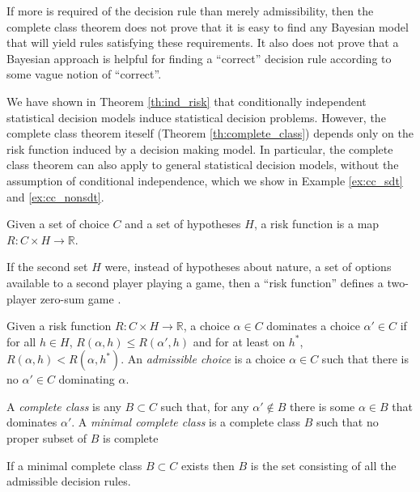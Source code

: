 If more is required of the decision rule than merely admissibility, then the complete class theorem does not prove that it is easy to find any Bayesian model that will yield rules satisfying these requirements. It also does not prove that a Bayesian approach is helpful for finding a ``correct'' decision rule according to some vague notion of ``correct''.

We have shown in Theorem \ref{th:ind_risk} that conditionally independent statistical decision models induce statistical decision problems. However, the complete class theorem iteself (Theorem \ref{th:complete_class}) depends only on the risk function induced by a decision making model. In particular, the complete class theorem can also apply to general statistical decision models, without the assumption of conditional independence, which we show in Example \ref{ex:cc_sdt} and \ref{ex:cc_nonsdt}.

\begin{definition}
Given a set of choice $C$ and a set of hypotheses $H$, a risk function is a map $R:C\times H\to \mathbb{R}$.
\end{definition}

If the second set $H$ were, instead of hypotheses about nature, a set of options available to a second player playing a game, then a ``risk function'' defines a two-player zero-sum game \citet{toutenburg_ferguson_1967}.

\begin{definition}\label{def:admissible_decision}
Given a risk function $R:C\times H\to \mathbb{R}$, a choice $\alpha\in C$ dominates a choice $\alpha'\in C$ if for all $h\in H$, $R(\alpha,h)\leq R(\alpha',h)$ and for at least on $h^*$, $R(\alpha,h)<R(\alpha,h^*)$. An \emph{admissible choice} is a choice $\alpha\in C$ such that there is no $\alpha'\in C$ dominating $\alpha$.
\end{definition}

\begin{definition}\label{th:complete_class}
A \emph{complete class} is any $B\subset C$ such that, for any $\alpha'\not \in B$ there is some $\alpha\in B$ that dominates $\alpha'$. A \emph{minimal complete class} is a complete class $B$ such that no proper subset of $B$ is complete
\end{definition}

\begin{theorem}
If a minimal complete class $B\subset C$ exists then $B$ is the set consisting of all the admissible decision rules.
\end{theorem}

